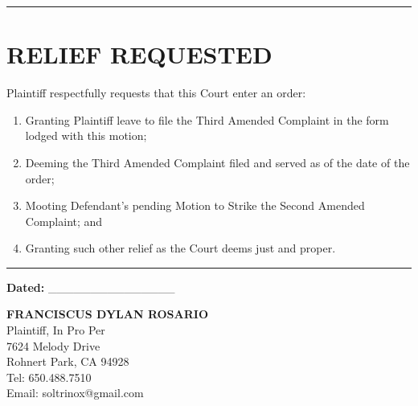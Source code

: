 \begin{center}\rule{0.5\linewidth}{0.5pt}\end{center}

\section{RELIEF REQUESTED}\label{relief-requested}

Plaintiff respectfully requests that this Court enter an order:

\begin{enumerate}
\def\labelenumi{\arabic{enumi}.}
\item
  Granting Plaintiff leave to file the Third Amended Complaint in the form lodged with this motion;
\item
  Deeming the Third Amended Complaint filed and served as of the date of the order;
\item
  Mooting Defendant's pending Motion to Strike the Second Amended Complaint; and
\item
  Granting such other relief as the Court deems just and proper.
\end{enumerate}

\begin{center}\rule{0.5\linewidth}{0.5pt}\end{center}

\textbf{Dated:} \_\_\_\_\_\_\_\_\_\_\_\_\_\_\_

\textbf{FRANCISCUS DYLAN ROSARIO}\\
Plaintiff, In Pro Per\\
7624 Melody Drive\\
Rohnert Park, CA 94928\\
Tel: 650.488.7510\\
Email: soltrinox@gmail.com

\nolinenumbers



